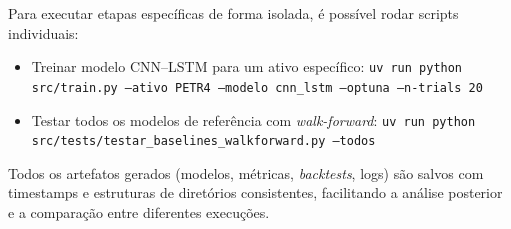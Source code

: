 Para executar etapas específicas de forma isolada, é possível rodar scripts individuais:
\begin{itemize}
  \item Treinar modelo CNN--LSTM para um ativo específico:
        \texttt{uv run python src/train.py --ativo PETR4 --modelo cnn\_lstm --optuna --n-trials 20}
        
  \item Testar todos os modelos de referência com \textit{walk-forward}:
        \texttt{uv run python src/tests/testar\_baselines\_walkforward.py --todos}
\end{itemize}

Todos os artefatos gerados (modelos, métricas, \textit{backtests}, logs) são salvos com timestamps e estruturas de diretórios consistentes, facilitando a análise posterior e a comparação entre diferentes execuções.


